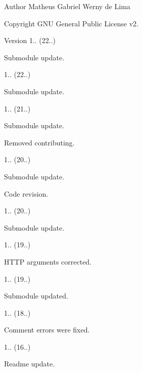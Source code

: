 \begin{DoxyAuthor}{Author}
Matheus Gabriel Werny de Lima 
\end{DoxyAuthor}
\begin{DoxyCopyright}{Copyright}
G\+NU General Public License v2. 
\end{DoxyCopyright}
\begin{DoxyVersion}{Version}
1.. (22..)
\begin{DoxyItemize}
\item Submodule update. 
\end{DoxyItemize}

1.. (22..)
\begin{DoxyItemize}
\item Submodule update. 
\end{DoxyItemize}

1.. (21..)
\begin{DoxyItemize}
\item Submodule update.
\item Removed contributing. 
\end{DoxyItemize}

1.. (20..)
\begin{DoxyItemize}
\item Submodule update.
\item Code revision. 
\end{DoxyItemize}

1.. (20..)
\begin{DoxyItemize}
\item Submodule update. 
\end{DoxyItemize}

1.. (19..)
\begin{DoxyItemize}
\item H\+T\+TP arguments corrected. 
\end{DoxyItemize}

1.. (19..)
\begin{DoxyItemize}
\item Submodule updated. 
\end{DoxyItemize}

1.. (18..)
\begin{DoxyItemize}
\item Comment errors were fixed. 
\end{DoxyItemize}

1.. (16..)
\begin{DoxyItemize}
\item Readme update. 
\end{DoxyItemize}


\end{DoxyVersion}
